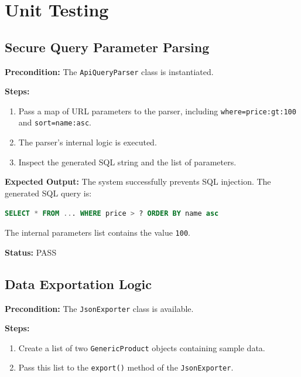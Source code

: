 \documentclass[12pt, a4paper]{report}
\begin{document}
\section{Unit Testing}

\subsection{Secure Query Parameter Parsing}

\noindent\textbf{Precondition:} The \lstinline|ApiQueryParser| class is instantiated.

\noindent\textbf{Steps:}
\begin{enumerate}
    \item Pass a map of URL parameters to the parser, including \lstinline|where=price:gt:100| and \lstinline|sort=name:asc|.
    \item The parser's internal logic is executed.
    \item Inspect the generated SQL string and the list of parameters.
\end{enumerate}

\noindent\textbf{Expected Output:}
The system successfully prevents SQL injection. The generated SQL query is:
\begin{lstlisting}[language=SQL, basicstyle=\ttfamily\small, breaklines=true]
SELECT * FROM ... WHERE price > ? ORDER BY name asc
\end{lstlisting}
The internal parameters list contains the value \lstinline|100|.

\noindent\textbf{Status:} PASS

\subsection{Data Exportation Logic}

\noindent\textbf{Precondition:} The \lstinline|JsonExporter| class is available.

\noindent\textbf{Steps:}
\begin{enumerate}
    \item Create a list of two \lstinline|GenericProduct| objects containing sample data.
    \item Pass this list to the \lstinline|export()| method of the \lstinline|JsonExporter|.
\end{enumerate}
\end{document}
